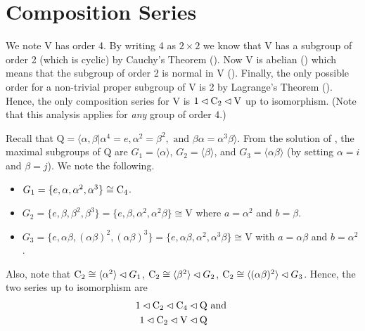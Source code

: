 \section{Composition Series}
\begin{questions}
    \item \begin{partquestions}{\roman*}
        \item We note $\mathrm{V}$ has order 4. By writing 4 as $2 \times 2$ we know that $\mathrm{V}$ has a subgroup of order 2 (which is cyclic) by Cauchy's Theorem (). Now $\mathrm{V}$ is abelian () which means that the subgroup of order 2 is normal in $\mathrm{V}$ (). Finally, the only possible order for a non-trivial proper subgroup of $\mathrm{V}$ is 2 by Lagrange's Theorem (). Hence, the only composition series for $\mathrm{V}$ is $1 \lhd \mathrm{C}_{2} \lhd \mathrm{V}$ up to isomorphism.\newline
        (Note that this analysis applies for \textit{any} group of order 4.)

        \item Recall that $\mathrm{Q} = \langle \alpha, \beta \vert \alpha^4 = e, \alpha^2 = \beta^2, \text{ and } \beta\alpha = \alpha^3\beta \rangle$. From the solution of , the maximal subgroups of $\mathrm{Q}$ are $G_1 = \langle \alpha \rangle$, $G_2 = \langle \beta \rangle$, and $G_3 = \langle \alpha\beta \rangle$ (by setting $\alpha = i$ and $\beta = j$). We note the following.
        \begin{itemize}
            \item $G_1 = \{e, \alpha, \alpha^2, \alpha^3\} \cong \mathrm{C}_{4}$.
            \item $G_2 = \{e, \beta, \beta^2, \beta^3\} = \{e, \beta, \alpha^2, \alpha^2\beta\} \cong \mathrm{V}$ where $a = \alpha^2$ and $b = \beta$.
            \item $G_3 = \{e, \alpha\beta, (\alpha\beta)^2, (\alpha\beta)^3\} = \{e, \alpha\beta, \alpha^2, \alpha^3\beta\} \cong \mathrm{V}$ with $a = \alpha\beta$ and $b = \alpha^2$.
        \end{itemize}
        Also, note that $\mathrm{C}_{2} \cong \langle \alpha^2 \rangle \lhd G_1$, $\mathrm{C}_{2} \cong \langle \beta^2 \rangle \lhd G_2$, $\mathrm{C}_{2} \cong \langle (\alpha\beta)^2 \rangle \lhd G_3$. Hence, the two series up to isomorphism are
        \begin{align*}
            1 \lhd \mathrm{C}_{2} \lhd \mathrm{C}_{4} \lhd \mathrm{Q} & \text{ and }\\
            1 \lhd \mathrm{C}_{2} \lhd \mathrm{V} \lhd \mathrm{Q}
        \end{align*}


\end{partquestions}
\end{questions}
